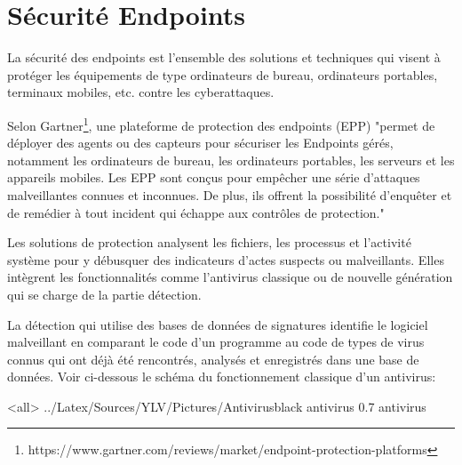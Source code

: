 \section{Sécurité Endpoints}


La sécurité des endpoints est l'ensemble des solutions et techniques qui visent à protéger les équipements de type ordinateurs de bureau, ordinateurs portables, terminaux mobiles, etc. contre les cyberattaques.

Selon Gartner\footnote{https://www.gartner.com/reviews/market/endpoint-protection-platforms}, une plateforme de protection des endpoints (EPP) "permet de déployer des agents ou des capteurs pour sécuriser les Endpoints gérés, notamment les ordinateurs de bureau, les ordinateurs portables, les serveurs et les appareils mobiles. Les EPP sont conçus pour empêcher une série d’attaques malveillantes connues et inconnues. De plus, ils offrent la possibilité d'enquêter et de remédier à tout incident qui échappe aux contrôles de protection."


Les solutions de protection analysent les fichiers, les processus et l’activité système pour y débusquer des indicateurs d’actes suspects ou malveillants. Elles intègrent les fonctionnalités comme l'antivirus classique ou de nouvelle génération qui se charge de la partie détection. 

La détection qui utilise des bases de données de signatures identifie le logiciel malveillant en comparant le code d'un programme au code de types de virus connus qui ont déjà été rencontrés, analysés et enregistrés dans une base de données.
Voir ci-dessous le schéma du fonctionnement classique d'un antivirus:

\mode<all>{\picframe
{../Latex/Sources/YLV/Pictures/Antivirusblack}%
{antivirus} %
{0.7} %
{antivirus} %
}

